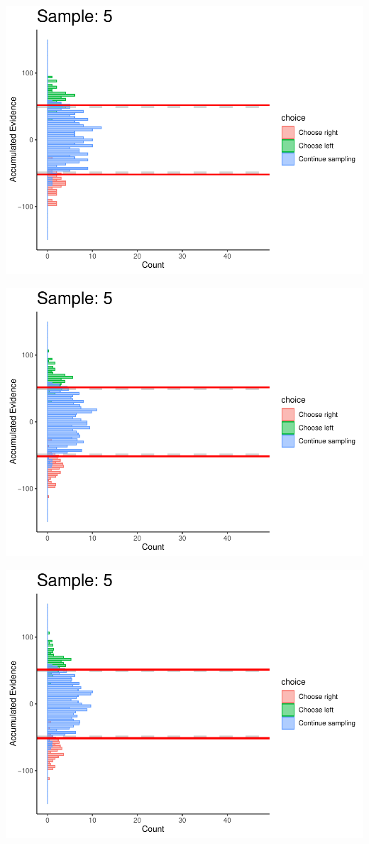 \documentclass[
]{book}
\begin{document}
\begin{center}\includegraphics[width=0.8\linewidth]{LateNightBayes_files/figure-latex/fixed_dcb-46} \end{center}

\begin{center}\includegraphics[width=0.8\linewidth]{LateNightBayes_files/figure-latex/fixed_dcb-47} \end{center}

\begin{center}\includegraphics[width=0.8\linewidth]{LateNightBayes_files/figure-latex/fixed_dcb-48} \end{center}
\end{document}
